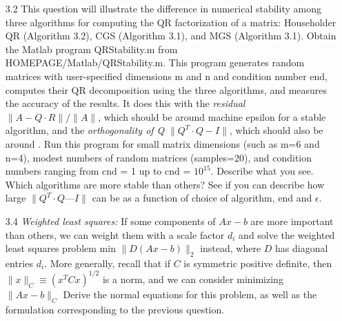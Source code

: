 \documentclass[12pt,letterpaper,reqno]{amsart}
\begin{document}
\begin{enumerate}
\begin{itemize}
\begin{flushleft}
    \end{flushleft}
\end{itemize}
\newpage

\item[3.2] This question will illustrate the difference in numerical stability among three algorithms for computing the QR factorization of a matrix: Householder QR (Algorithm 3.2), CGS (Algorithm 3.1), and MGS (Algorithm 3.1). Obtain the Matlab program QRStability.m from HOMEPAGE/Matlab/QRStability.m. This program generates random matrices with user-specified dimensions m and n and condition number end, computes their QR decomposition using the three algorithms, and measures the accuracy of the results. It does this with the \textit{residual} $\|A-Q\cdot R\|/\|A\|$, which should be around machine epsilon for a stable algorithm, and the \textit{orthogonality of Q} $\|Q^T \cdot Q - I\|$, which should also be around . Run this program for small matrix dimensions (such as m=6 and n=4), modest numbers of random matrices (samples=20), and condition numbers ranging from cnd = 1 up to cnd = $10^{15}$. Describe what you see. Which algorithms are more stable than others? See if you can describe how large $\|Q^T \cdot Q —I\|$ can be as a function of choice of algorithm, end and $\epsilon$.
\newline
\begin{flushleft}

\end{flushleft}
\newpage

\item[3.4] \textit{Weighted least squares:} If some components of $Ax - b$ are more important than others, we can weight them with a scale factor $d_i$ and solve the weighted least squares problem min $\|D(Ax - b)\|_2$ instead, where $D$ has diagonal entries $d_i$. More generally, recall that if $C$ is symmetric positive definite, then $\|x\|_C \equiv (x^TCx)^{1/2}$ is a norm, and we can consider minimizing $\|Ax -b\|_C$ Derive the normal equations for this problem, as well as the formulation corresponding to the previous question.
\newline
\begin{flushleft}

\end{flushleft}

\end{enumerate}
\end{document}
